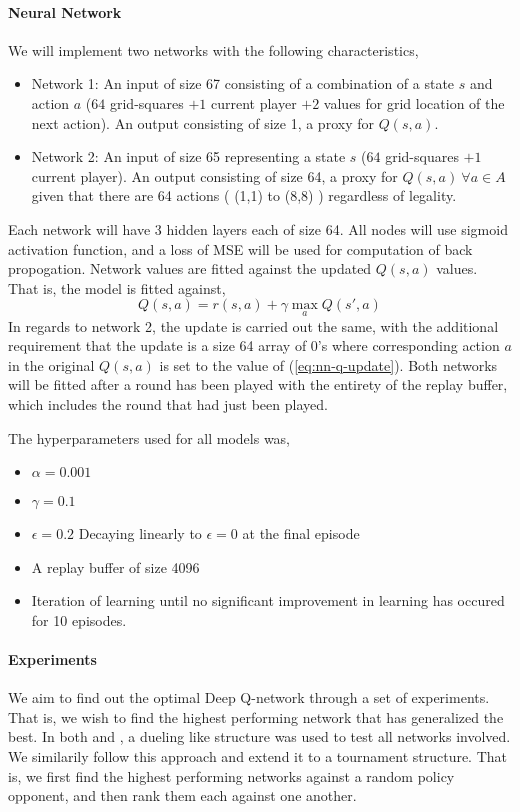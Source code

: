 \documentclass[../report.tex]{subfiles}
\begin{document}
\paragraph{Neural Network}
We will implement two networks with the following characteristics,
\begin{itemize}
    \item Network 1: An input of size 67 consisting of a combination of a state $s$ and action $a$ ($64$ grid-squares $+ 1$ current player $+ 2$ values for grid location of the next action). An output consisting of size 1, a proxy for $Q(s,a)$.
    \item Network 2: An input of size 65 representing a state $s$ ($64$ grid-squares $+ 1$ current player). An output consisting of size 64, a proxy for $Q(s,a)\:\forall a \in A$ given that there are 64 actions ( (1,1) to (8,8) ) regardless of legality.
\end{itemize}
Each network will have 3 hidden layers each of size 64. All nodes will use sigmoid activation function, and a loss of MSE will be used for computation of back propogation. Network values are fitted against the updated $Q(s,a)$ values. That is, the model is fitted against,
\begin{equation} \label{eq:nn-q-update}
    Q(s,a) = r(s,a) + \gamma \max_a Q(s',a)
\end{equation}
In regards to network 2, the update is carried out the same, with the additional requirement that the update is a size 64 array of 0's where corresponding action $a$ in the original $Q(s,a)$ is set to the value of (\ref{eq:nn-q-update}). Both networks will be fitted after a round has been played with the entirety of the replay buffer, which includes the round that had just been played.

The hyperparameters used for all models was,
\begin{itemize}
    \item $\alpha=0.001$
    \item $\gamma=0.1$
    \item $\epsilon=0.2$ Decaying linearly to $\epsilon=0$ at the final episode
    \item A replay buffer of size 4096
    \item Iteration of learning until no significant improvement in learning has occured for 10 episodes.
\end{itemize}

\paragraph{Experiments}
We aim to find out the optimal Deep Q-network through a set of experiments. That is, we wish to find the highest performing network that has generalized the best. In both \citet{ree13} and \citet{VANECK20081999}, a dueling like structure was used to test all networks involved. We similarily follow this approach and extend it to a tournament structure. That is, we first find the highest performing networks against a random policy opponent, and then rank them each against one another.
\end{document}
